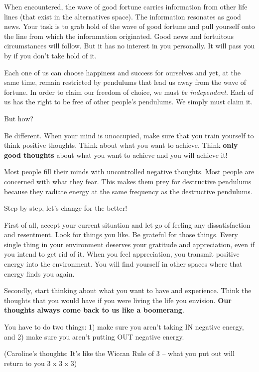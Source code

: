 \documentclass[
  openany]{book}
\begin{document}
When encountered, the wave of good fortune carries information from other life lines (that exist in the alternatives space). The information resonates as good news. Your task is to grab hold of the wave of good fortune and pull yourself onto the line from which the infornmation originated. Good news and fortuitous circumstances will follow. But it has no interest in you personally. It will pass you by if you don't take hold of it.

Each one of us can choose happiness and success for ourselves and yet, at the same time, remain restricted by pendulums that lead us away from the wave of fortune. In order to claim our freedom of choice, we must \emph{be independent}. Each of us has the right to be free of other people's pendulums. We simply must claim it.

But how?

Be different. When your mind is unoccupied, make sure that you train yourself to think positive thoughts. Think about what you want to achieve. Think \textbf{only good thoughts} about what you want to achieve and you will achieve it!

Most people fill their minds with uncontrolled negative thoughts. Most people are concerned with what they fear. This makes them prey for destructive pendulums because they radiate energy at the same frequency as the destructive pendulums.

Step by step, let's change for the better!

First of all, accept your current situation and let go of feeling any dissatisfaction and resentment. Look for things you like. Be grateful for those things. Every single thing in your environment deserves your gratitude and appreciation, even if you intend to get rid of it. When you feel appreciation, you transmit positive energy into the environment. You will find yourself in other spaces where that energy finds you again.

Secondly, start thinking about what you want to have and experience. Think the thoughts that you would have if you were living the life you envision. \textbf{Our thoughts always come back to us like a boomerang}.

You have to do two things:
1) make sure you aren't taking IN negative energy, and
2) make sure you aren't putting OUT negative energy.

(Caroline's thoughts: It's like the Wiccan Rule of 3 -- what you put out will return to you 3 x 3 x 3)
\end{document}
